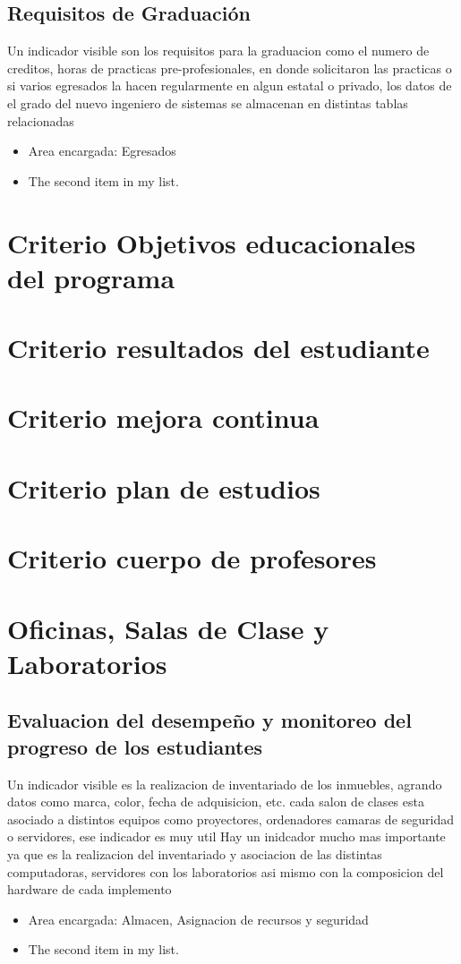 \documentclass[12pt,a4paper]{report}
\begin{document}
\subsection{Requisitos de Graduación}
Un indicador visible son los requisitos para la graduacion como el numero de creditos, horas de practicas pre-profesionales, en donde solicitaron las practicas o si varios egresados la hacen regularmente en algun estatal o privado, los datos de el grado del nuevo ingeniero de sistemas se almacenan en distintas tablas relacionadas
\begin{itemize}
\item Area encargada: Egresados
\item The second item in my list.
\end{itemize}

\section{ Criterio Objetivos educacionales del programa}

\section{ Criterio resultados del estudiante}

\section{ Criterio mejora continua}

\section{ Criterio plan de estudios}

\section{ Criterio cuerpo de profesores}


\section{ Oficinas, Salas de Clase y Laboratorios}
\subsection{Evaluacion del desempeño y monitoreo del progreso de los estudiantes}
Un indicador visible es la realizacion de inventariado de los inmuebles, agrando datos como marca, color, fecha de adquisicion, etc.
cada salon de clases esta asociado a distintos equipos como proyectores, ordenadores camaras de seguridad o servidores, ese indicador es muy util
Hay un inidcador mucho mas importante ya que es la realizacion del inventariado y asociacion de las distintas computadoras, servidores con los laboratorios asi mismo con la composicion del hardware de cada implemento
\begin{itemize}
\item Area encargada: Almacen, Asignacion de recursos y seguridad
\item The second item in my list.
\end{itemize}
\end{document}
